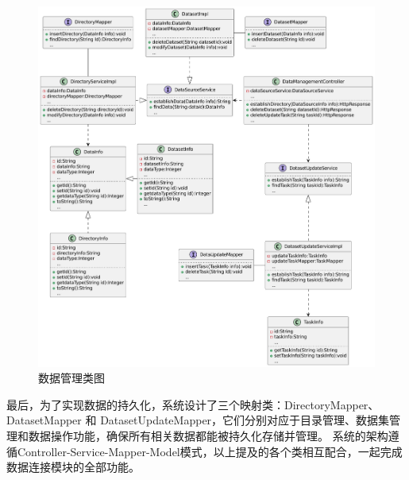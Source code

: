 \begin{figure}[H]
    \centering
    \caption{数据管理类图}
    \label{fig:datamanageclass}
    \includegraphics[width=.9\linewidth]{figure/数据管理类图.pdf}
\end{figure}
最后，为了实现数据的持久化，系统设计了三个映射类：DirectoryMapper、DatasetMapper 和 DatasetUpdateMapper，它们分别对应于目录管理、数据集管理和数据操作功能，确保所有相关数据都能被持久化存储并管理。
系统的架构遵循Controller-Service-Mapper-Model模式，以上提及的各个类相互配合，一起完成数据连接模块的全部功能。
